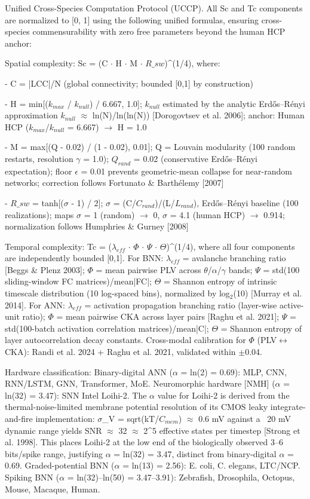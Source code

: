 \documentclass[a4paper,12pt]{article}
\providecommand{\textsubscript}[1]{\ensuremath{_{\text{#1}}}}
\begin{document}
Unified Cross-Species Computation Protocol (UCCP). All Sc and Tc components are normalized to [0, 1] using the following unified formulas, ensuring cross-species commensurability with zero free parameters beyond the human HCP anchor:


Spatial complexity: Sc = (C $\cdot$ H $\cdot$ M $\cdot$ $R\_{sw}$)^(1/4), where:


- C = |LCC|/N (global connectivity; bounded [0,1] by construction)


- H = min[($k_{max}$ / $k_{null}$) / 6.667, 1.0]; $k_{null}$ estimated by the analytic Erd\H{o}s--R\'enyi approximation $k_{null}$ $\approx$ ln(N)/ln(ln(N)) [Dorogovtsev et al. 2006]; anchor: Human HCP ($k_{max}$/$k_{null}$ = 6.667) $\rightarrow$ H = 1.0


- M = max[(Q - 0.02) / (1 - 0.02), 0.01]; Q = Louvain modularity (100 random restarts, resolution $\gamma$ = 1.0); $Q_{rand}$ = 0.02 (conservative Erd\H{o}s--R\'enyi expectation); floor $\epsilon$ = 0.01 prevents geometric-mean collapse for near-random networks; correction follows Fortunato \& Barth\'elemy [2007]


- $R\_{sw}$ = tanh[($\sigma$ - 1) / 2]; $\sigma$ = (C/$C_{rand}$)/(L/$L_{rand}$), Erd\H{o}s--R\'enyi baseline (100 realizations); maps $\sigma$ = 1 (random) $\rightarrow$ 0, $\sigma$ = 4.1 (human HCP) $\rightarrow$ 0.914; normalization follows Humphries \& Gurney [2008]


Temporal complexity: Tc = ($\lambda_{eff}$ $\cdot$ $\Phi$ $\cdot$ $\Psi$ $\cdot$ $\Theta$)^(1/4), where all four components are independently bounded [0,1].
For BNN: $\lambda_{eff}$ = avalanche branching ratio [Beggs \& Plenz 2003]; $\Phi$ = mean pairwise PLV across $\theta$/$\alpha$/$\gamma$ bands; $\Psi$ = std(100 sliding-window FC matrices)/mean|FC|; $\Theta$ = Shannon entropy of intrinsic timescale distribution (10 log-spaced bins), normalized by log\textsubscript{2}(10) [Murray et al. 2014].
For ANN: $\lambda_{eff}$ = activation propagation branching ratio (layer-wise active-unit ratio); $\Phi$ = mean pairwise CKA across layer pairs [Raghu et al. 2021]; $\Psi$ = std(100-batch activation correlation matrices)/mean|C|; $\Theta$ = Shannon entropy of layer autocorrelation decay constants.
Cross-modal calibration for $\Phi$ (PLV$\leftrightarrow$CKA): Randi et al. 2024 + Raghu et al. 2021, validated within $\pm$0.04.


Hardware classification: Binary-digital ANN ($\alpha$ = ln(2) = 0.69): MLP, CNN, RNN/LSTM, GNN, Transformer, MoE.
Neuromorphic hardware [NMH\dag] ($\alpha$ = ln(32) = 3.47): SNN Intel Loihi-2.
The $\alpha$ value for Loihi-2 is derived from the thermal-noise-limited membrane potential resolution of its CMOS leaky integrate-and-fire implementation: $\sigma$_V = sqrt(kT/$C_{mem}$) $\approx$ 0.6 mV against a ~20 mV dynamic range yields SNR $\approx$ 32 $\approx$ 2^5 effective states per timestep [Strong et al. 1998].
This places Loihi-2 at the low end of the biologically observed 3--6 bits/spike range, justifying $\alpha$ = ln(32) = 3.47, distinct from binary-digital $\alpha$ = 0.69.
Graded-potential BNN ($\alpha$ = ln(13) = 2.56): E. coli, C. elegans, LTC/NCP.
Spiking BNN ($\alpha$ = ln(32)--ln(50) = 3.47--3.91): Zebrafish, Drosophila, Octopus, Mouse, Macaque, Human.
\end{document}
